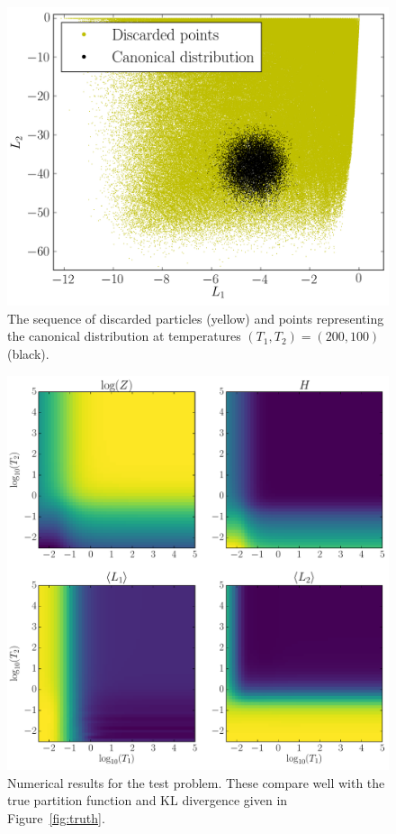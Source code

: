 \documentclass[journal,article,accept,moreauthors,pdftex,12pt,a4paper]{mdpi}
\begin{document}
\begin{figure}
\centering
\includegraphics[scale=0.75]{figures/output.png}
\caption{The sequence of discarded particles (yellow) and
points representing the canonical distribution at temperatures
$(T_1, T_2) = (200, 100)$ (black).\label{fig:output}}
\end{figure}



\begin{figure}
\centering
\includegraphics[scale=0.5]{figures/results.pdf}
\caption{Numerical results for the test problem. These compare well with the
true partition function and KL divergence given in Figure~\ref{fig:truth}.
\label{fig:results}}
\end{figure}
\end{document}
